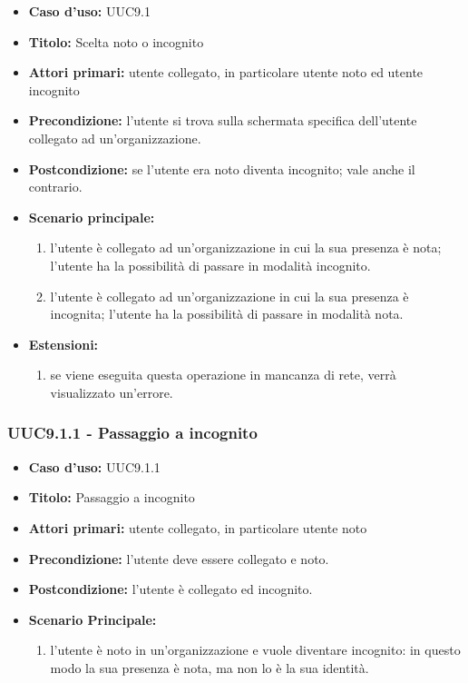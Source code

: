 \documentclass[casi-duso]{subfiles}
\begin{document}
\begin{itemize}
  \item \textbf{Caso d’uso:} UUC9.1
  \item \textbf{Titolo:} Scelta noto o incognito
  \item \textbf{Attori primari:} utente collegato, in particolare utente noto ed utente incognito
  \item \textbf{Precondizione:} l'utente si trova sulla schermata specifica dell'utente collegato ad un'organizzazione.
  \item \textbf{Postcondizione:} se l'utente era noto diventa incognito; vale anche il contrario.
  \item \textbf{Scenario principale:}
        \begin{enumerate}
          \item l'utente è collegato ad un'organizzazione in cui la sua presenza è nota; l'utente ha la possibilità di passare in modalità incognito.
          \item l'utente è collegato ad un'organizzazione in cui la sua presenza è incognita; l'utente ha la possibilità di passare in modalità nota.
        \end{enumerate}
  \item \textbf{Estensioni:}
        \begin{enumerate}
          \item se viene eseguita questa operazione in mancanza di rete, verrà visualizzato un'errore.
        \end{enumerate}
\end{itemize}

\subsubsection{UUC9.1.1 - Passaggio a incognito}%
\label{subsub:UUC9.1.1utente}
\begin{itemize}
  \item \textbf{Caso d’uso:} UUC9.1.1
  \item \textbf{Titolo:} Passaggio a incognito
  \item \textbf{Attori primari:} utente collegato, in particolare utente noto
  \item \textbf{Precondizione:} l'utente deve essere collegato e noto.
  \item \textbf{Postcondizione:} l'utente è collegato ed incognito.
  \item \textbf{Scenario Principale:}
        \begin{enumerate}
          \item l'utente è noto in un'organizzazione e vuole diventare incognito: in questo modo la sua presenza è nota, ma non lo è la sua identità.
        \end{enumerate}
\end{itemize}
\end{document}
